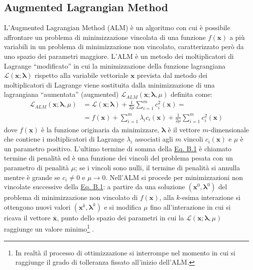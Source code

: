 \documentclass[12pt,a4paper,twoside]{report}
\newcommand{\vect}[1]{\boldsymbol{#1}}
\begin{document}
\begin{appendices}
		\chapter{Augmented Lagrangian Method}
		L'Augmented Lagrangian Method (ALM) è un algoritmo con cui è possibile affrontare un problema di minimizzazione vincolata di una funzione $f\left(\vect{x}\right)$ a più variabili in un problema di minimizzazione non vincolato, caratterizzato però da uno spazio dei parametri maggiore. L'ALM è un metodo dei moltiplicatori di Lagrange ``modificato'' in cui la minimizzazione della funzione lagrangiana $\mathcal{L}\left(\vect{x};\vect{\lambda}\right)$ rispetto alla variabile vettoriale $\vect{x}$ prevista dal metodo dei moltiplicatori di Lagrange viene sostituita dalla minimizzazione di una lagrangiana ``aumentata'' (augmented) $\mathcal{L}_{ALM}\left(\vect{x};\vect{\lambda},\mu\right)$ definita come:
		\begin{equation}
			\begin{aligned}
				\mathcal{L}_{ALM}\left(\vect{x};\vect{\lambda},\mu\right)&=\mathcal{L}\left(\vect{x};\vect{\lambda}\right)+\frac{1}{2\mu}\sum_{i=1}^{m}c_i^2\left(\vect{x}\right)=\\
				&=f\left(\vect{x}\right)+\sum_{i=1}^{m}\lambda_ic_i\left(\vect{x}\right)+\frac{1}{2\mu}\sum_{i=1}^{m}c_i^2\left(\vect{x}\right)
			\end{aligned}
			\label{eq:augmented_lagrangian_funct}
		\end{equation}
		dove $f\left(\vect{x}\right)$ è la funzione originaria da minimizzare, $\vect{\lambda}$ è il vettore $m$-dimensionale che contiene i moltiplicatori di Lagrange $\lambda_i$ associati agli $m$ vincoli $c_i\left(\vect{x}\right)$ e $\mu$ è un parametro positivo. L'ultimo termine di somma della \hyperref[eq:augmented_lagrangian_funct]{Eq. B.1} è chiamato termine di penalità ed è una funzione dei vincoli del problema pesata con un parametro di penalità $\mu$; se i vincoli sono nulli, il termine di penalità si annulla mentre è grande se $c_i\ne0$ e $\mu\rightarrow0$. Nell'ALM si procede per minimizzazioni non vincolate successive della \hyperref[eq:augmented_lagrangian_funct]{Eq. B.1}: a partire da una soluzione $\left(\vect{x}^0,\vect{\lambda}^0\right)$ del problema di minimizzazione non vincolato di $f\left(\vect{x}\right)$, alla $k$-esima interazione si ottengono nuovi valori $\left(\vect{x}^k,\vect{\lambda}^k\right)$ e si modifica $\mu$ fino all'interazione in cui si ricava il vettore $\overline{\vect{x}}$, punto dello spazio dei parametri in cui la $\mathcal{L}\left(\vect{x};\vect{\lambda},\mu\right)$ raggiunge un valore minimo\footnote{In realtà il processo di ottimizzazione si interrompe nel momento in cui si raggiunge il grado di tolleranza fissato all'inizio dell'ALM.} \cite{Cho2016-st}.
		

\end{appendices}
\end{document}
